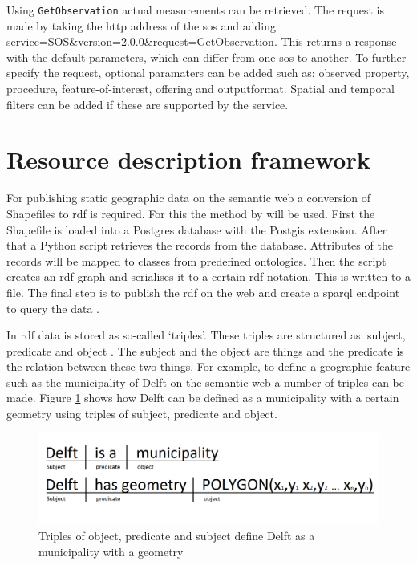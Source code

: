 Using \texttt{GetObservation} actual measurements can be retrieved. The request is made by taking the \ac{http} address of the \ac{sos} and adding \url{service=SOS\&version=2.0.0\&request=GetObservation}. This returns a response with the default parameters, which can differ from one \ac{sos} to another. To further specify the request, optional paramaters can be added such as: observed property, procedure, feature-of-interest, offering and outputformat. Spatial and temporal filters can be added if these are supported by the service. 

\section{Resource description framework}
For publishing static geographic data on the semantic web a conversion of Shapefiles to \ac{rdf} is required. For this the method by \cite{LD:Missier} will be used. First the Shapefile is loaded into a Postgres database with the Postgis extension. After that a Python script retrieves the records from the database. Attributes of the records will be mapped to classes from predefined ontologies. Then the script creates an \ac{rdf} graph and serialises it to a certain \ac{rdf} notation. This is written to a file. The final step is to publish the \ac{rdf} on the web and create a \ac{sparql} endpoint to query the data \citep{LD:Missier}. 

In \ac{rdf} data is stored as so-called `triples'. These triples are structured as: subject, predicate and object \citep{LD:Berners-lee}. The subject and the object are things and the predicate is the relation between these two things. For example, to define a geographic feature such as the municipality of Delft on the semantic web a number of triples can be made. Figure \ref{fig:Triples} shows how Delft can be defined as a municipality with a certain geometry using triples of subject, predicate and object.

\begin{figure}
	\includegraphics[width=0.7\linewidth]{figs/Triples.png}
	\caption{Triples of object, predicate and subject define Delft as a municipality with a geometry}
	\label{fig:Triples}
\end{figure}

